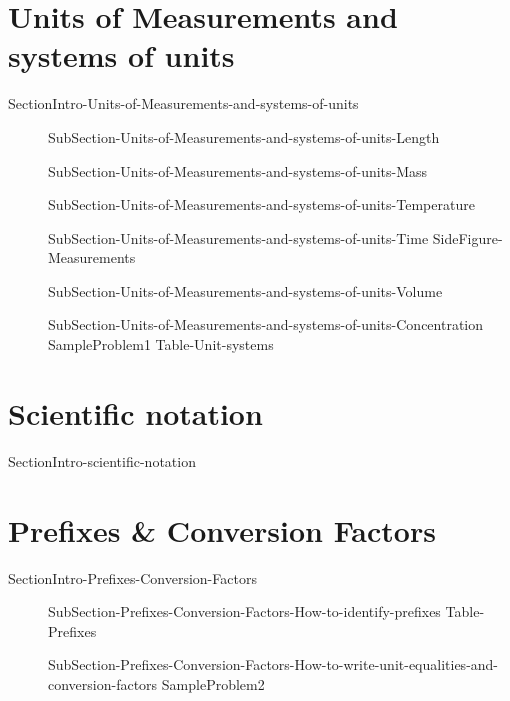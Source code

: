 \documentclass[main.tex]{subfiles}
\newcommand\chapterlabel{Ch-measurements}\setcounter{figurenewcounter}{0}\setcounter{tablenewcounter}{0}\setcounter{formulanewcounter}{0}
\begin{document}
\section{Units of Measurements and systems of units}
{SectionIntro-Units-of-Measurements-and-systems-of-units}
\sloppy\begin{description}
\item[]{SubSection-Units-of-Measurements-and-systems-of-units-Length}
\item[]{SubSection-Units-of-Measurements-and-systems-of-units-Mass}
\item[]{SubSection-Units-of-Measurements-and-systems-of-units-Temperature}
\item[]{SubSection-Units-of-Measurements-and-systems-of-units-Time}
{SideFigure-Measurements}
\item[]{SubSection-Units-of-Measurements-and-systems-of-units-Volume}
\item[]{SubSection-Units-of-Measurements-and-systems-of-units-Concentration}
{SampleProblem1}
\newpage
{Table-Unit-systems}
\end{description}

\section{Scientific notation} {SectionIntro-scientific-notation}
\section{Prefixes \& Conversion Factors}
{SectionIntro-Prefixes-Conversion-Factors}
\sloppy\begin{description}
\item[]{SubSection-Prefixes-Conversion-Factors-How-to-identify-prefixes}
{Table-Prefixes}
\item[]{SubSection-Prefixes-Conversion-Factors-How-to-write-unit-equalities-and-conversion-factors}
{SampleProblem2}
\end{description}
\end{document}
